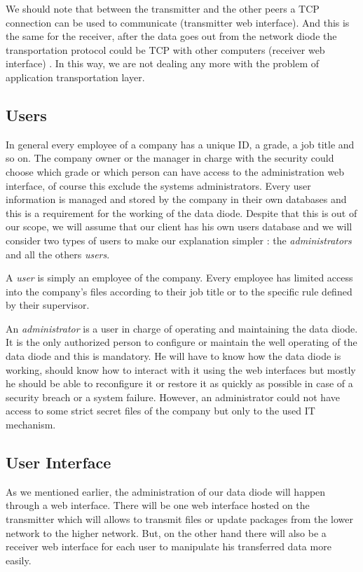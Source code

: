 \documentclass[a4paper,10pt]{article}
\begin{document}
We should note that between the transmitter and the other peers a TCP connection can be used to communicate (transmitter web interface). And this is the same for the receiver, after the data goes out from the network diode the transportation protocol could be TCP with other computers (receiver web interface) . In this way, we are not dealing any more with the problem of application transportation layer. 

\subsection{Users} 
In general every employee of a company has a unique ID, a grade, a job title and so on. The company owner or the manager in charge with the security could choose which grade or which person can have access to the administration web interface, of course this exclude the systems administrators. Every user information is managed and stored by the company in their own databases and this is a requirement for the working of the data diode. Despite that this is out of our scope, we will assume that our client has his own users database and we will consider two types of users to make our explanation simpler : the \textit{administrators} and all the others \textit{users}.

A \textit{user} is simply an employee of the company. Every employee has limited access into the company's files according to their job title or to the specific rule defined by their supervisor.

An \textit{administrator} is a user in charge of operating and maintaining the data diode. It is the only authorized person to configure or maintain the well operating of the data diode and this is mandatory. He will have to know how the data diode is working, should know how to interact with it using the web interfaces but mostly he should be able to reconfigure it or restore it as quickly as possible in case of a security breach or a system failure. However, an administrator could not have access to some strict secret files of the company but only to the used IT mechanism.


\subsection{User Interface}

As we mentioned earlier, the administration of our data diode will happen through a web interface. There will be one web interface hosted on the transmitter which will allows to transmit files or update packages from the lower network to the higher network. But, on the other hand there will also be a receiver web interface for each user to manipulate his transferred data more easily.
\end{document}
